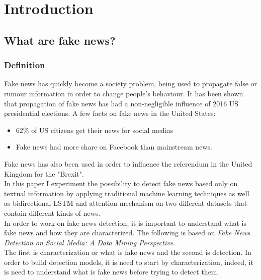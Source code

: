 ﻿\chapter{Introduction} \label{section:intro}
\section{What are fake news?}
\subsection{Definition}
Fake news has quickly become a society problem, being used to propagate false or rumour information in order to change people’s behaviour. It has been shown that propagation of fake news has had a non-negligible influence of 2016 US presidential elections\cite{Allcott2017}. A few facts on fake news in the United States: 
\begin{itemize}
 \item $62\%$ of US citizens get their news for social medias\cite{gottfried2016news}
 \item Fake news had more share on Facebook than mainstream news\cite{silverman2016teens}.
\end{itemize}
Fake news has also been used in order to influence the referendum in the United Kingdom for the "Brexit". \\

In this paper I experiment the possibility to detect fake news based only on textual information by applying traditional machine learning techniques\cite{Fan2008LIBLINEARAL,Robertson2004,zhang_optimality_nodate} as well as bidirectional-LSTM\cite{Hochreiter1997LongSM} and attention mechanism\cite{zhou-etal-2016-attention} on two different datasets that contain different kinds of news.\\
In order to work on fake news detection, it is important to understand what is fake news and how they are characterized. The following is based on \textit{Fake News Detection on Social Media: A Data Mining Perspective}\cite{shu2017fake}.\\

The first is characterization or what is fake news and the second is detection. In order to build detection models, it is need to start by characterization, indeed, it is need to understand what is fake news before trying to detect them. \\

